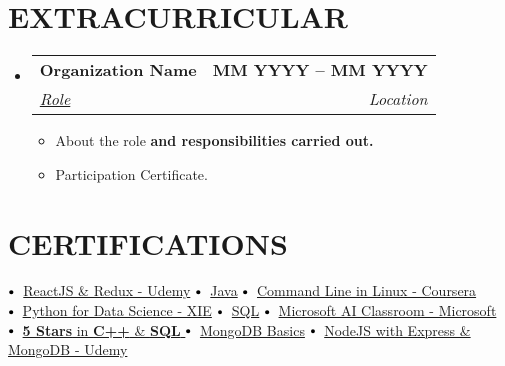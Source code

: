 \documentclass[letterpaper,11pt]{article}
\makeatletter
\newcommand{\resumeItem}[1]{
  \item\small{
    {#1 \vspace{-2pt}}
  }
}
\newcommand{\resumeSubheading}[4]{
  \vspace{-2pt}\item
    \begin{tabular*}{1.0\textwidth}[t]{l@{\extracolsep{\fill}}r}
      \textbf{\large#1} & \textbf{\small #2} \\
      \textit{\large#3} & \textit{\small #4} \\
     
    \end{tabular*}\vspace{-7pt}
}
\newcommand{\resumeSubHeadingListStart}{\begin{itemize}[leftmargin=0.0in, label={}]}
\newcommand{\resumeSubHeadingListEnd}{\end{itemize}}
\newcommand{\resumeItemListStart}{\begin{itemize}}
\newcommand{\resumeItemListEnd}{\end{itemize}\vspace{-5pt}}
\newcommand\sbullet[1][.5]{\mathbin{\vcenter{\hbox{\scalebox{#1}{$\bullet$}}}}}
\makeatother
\begin{document}
\section{EXTRACURRICULAR}
    \resumeSubHeadingListStart
        \resumeSubheading{Organization Name \href{Certificate Proof link}{\raisebox{-0.1\height}\faExternalLink } }{MM YYYY -- MM YYYY}{\underline{Role}}{Location}
            \resumeItemListStart
                \resumeItem{\normalsize{About the role \textbf{and responsibilities carried out.}}}
                \resumeItem{\normalsize{Participation Certificate. \href{ParticipationCertificateLink.com}{\raisebox{-0.1\height}\faExternalLink }}}
            \resumeItemListEnd
    \resumeSubHeadingListEnd
 \vspace{-11pt}
 
\section{CERTIFICATIONS}


$\sbullet[.75] \hspace{0.1cm}$ {\href{certificateLink.com}{ReactJS \& Redux - Udemy}} \hspace{1.6cm}
$\sbullet[.75] \hspace{0.1cm}$ {\href{certificateLink.com}{Java}} \hspace{2.59cm}
$\sbullet[.75] \hspace{0.2cm}${\href{certificateLink.com} {Command Line in Linux - Coursera}}\\


$\sbullet[.75] \hspace{0.2cm}${\href{certificateLink.com}{Python for Data Science - XIE}} \hspace{1cm}
$\sbullet[.75] \hspace{0.1cm}$ {\href{certificateLink.com}{SQL}} \hspace{2.6cm}
$\sbullet[.75] \hspace{0.2cm}${\href{certificateLink.com}{Microsoft AI Classroom - Microsoft}} \\


$\sbullet[.75] \hspace{0.2cm}${\href{certificateLink.com}{\textbf{5 Stars} in \textbf{C++} \& \textbf{SQL} \href{certificateLink.com}{\raisebox{-0.1\height}\faExternalLink }}}\hspace{1.45cm}
$\sbullet[.75] \hspace{0.2cm}${\href{certificateLink.com}{MongoDB Basics}} \hspace{0.5cm}
$\sbullet[.75] \hspace{0.2cm}${\href{certificateLink.com}{NodeJS with Express \& MongoDB - Udemy}} \\
\end{document}
